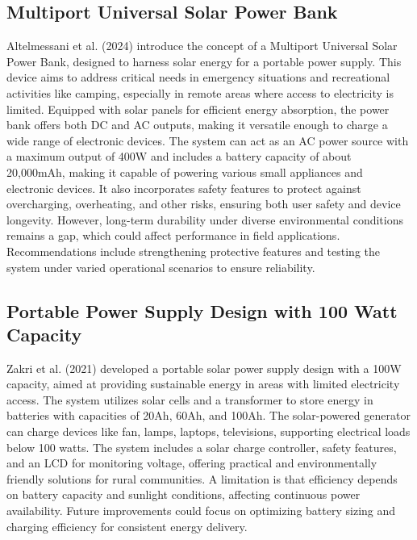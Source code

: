 {\subsection{Multiport Universal Solar Power Bank}
Altelmessani et al. (2024) introduce the concept of a Multiport Universal Solar Power Bank, designed to harness solar energy for a portable power supply. This device aims to address critical needs in emergency situations and recreational activities like camping, especially in remote areas where access to electricity is limited. Equipped with solar panels for efficient energy absorption, the power bank offers both DC and AC outputs, making it versatile enough to charge a wide range of electronic devices. The system can act as an AC power source with a maximum output of 400W and includes a battery capacity of about 20,000mAh, making it capable of powering various small appliances and electronic devices. It also incorporates safety features to protect against overcharging, overheating, and other risks, ensuring both user safety and device longevity.  However, long-term durability under diverse environmental conditions remains a gap, which could affect performance in field applications. Recommendations include strengthening protective features and testing the system under varied operational scenarios to ensure reliability.


\subsection{Portable Power Supply Design with 100 Watt Capacity}
Zakri et al. (2021) developed a portable solar power supply design with a 100W capacity, aimed at providing sustainable energy in areas with limited electricity access. The system utilizes solar cells and a transformer to store energy in batteries with capacities of 20Ah, 60Ah, and 100Ah. The solar-powered generator can charge devices like fan, lamps, laptops, televisions, supporting electrical loads below 100 watts. The system includes a solar charge controller, safety features, and an LCD for monitoring voltage, offering practical and environmentally friendly solutions for rural communities. A limitation is that efficiency depends on battery capacity and sunlight conditions, affecting continuous power availability. Future improvements could focus on optimizing battery sizing and charging efficiency for consistent energy delivery.

}
